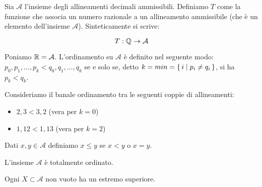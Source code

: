 Sia $\mathcal{A}$ l'insieme degli allineamenti decimali ammissibili. Definiamo $T$ come la funzione che associa un numero razionale a un allineamento ammissibile (che è un elemento dell'insieme $\mathcal{A}$). Sinteticamente si scrive:

\begin{equation*}
T : \mathbb Q \rightarrow \mathcal{A}
\end{equation*}

Poniamo $\mathbb R = \mathcal{A}$. L'ordinamento su $\mathcal{A}$ è definito nel seguente modo: $p_0, p_1, \dots, p_k < q_0, q_1, \dots, q_k$ se e solo se, detto $k = min = \set{i | p_i \neq q_i}$, si ha $p_k < q_k$. 

\begin{example}
Consideriamo il banale ordinamento tra le seguenti coppie di allineamenti:
\begin{itemize}
\item $2,3 < 3,2$ (vera per $k = 0$)
\item $1,12 < 1,13$ (vera per $k = 2$)
\end{itemize}
\end{example}

\begin{definition}
Dati $x, y \in \mathcal{A}$ definiamo $x \le y$ se $x < y$ o $x = y$.
\end{definition}

L'insieme $\mathcal{A}$ è totalmente ordinato.

\begin{proposition}
Ogni $X \subset \mathcal{A}$ non vuoto ha un estremo superiore.
\end{proposition}

